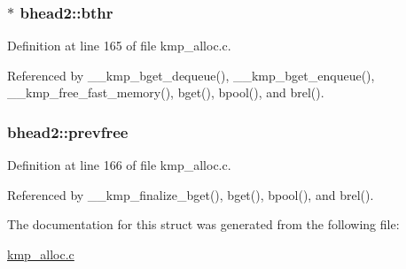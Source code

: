 \hypertarget{structbhead2_a641b1866310f899813f98a52a287a32e}{
\subsubsection[{bthr}]{$\ast$ bhead2\-::bthr}}\label{structbhead2_a641b1866310f899813f98a52a287a32e}


Definition at line 165 of file kmp\-\_\-alloc.\-c.



Referenced by \-\_\-\-\_\-kmp\-\_\-bget\-\_\-dequeue(), \-\_\-\-\_\-kmp\-\_\-bget\-\_\-enqueue(), \-\_\-\-\_\-kmp\-\_\-free\-\_\-fast\-\_\-memory(), bget(), bpool(), and brel().

\hypertarget{structbhead2_a2d15b44cc33113af141a1ed4e66f3ad0}{
\subsubsection[{prevfree}]{ bhead2\-::prevfree}}\label{structbhead2_a2d15b44cc33113af141a1ed4e66f3ad0}


Definition at line 166 of file kmp\-\_\-alloc.\-c.



Referenced by \-\_\-\-\_\-kmp\-\_\-finalize\-\_\-bget(), bget(), bpool(), and brel().



The documentation for this struct was generated from the following file\-:\begin{DoxyCompactItemize}
\item 
\hyperlink{kmp__alloc_8c}{kmp\-\_\-alloc.\-c}\end{DoxyCompactItemize}
